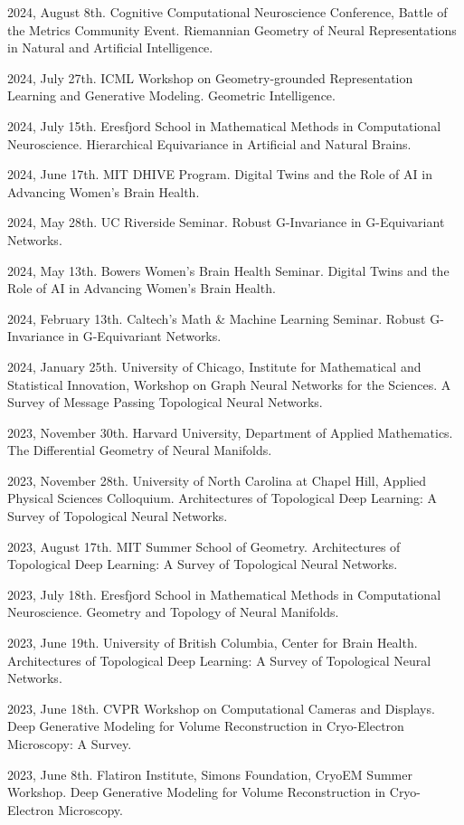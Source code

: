 2024, August 8th. Cognitive Computational Neuroscience Conference, Battle of the Metrics Community Event. Riemannian Geometry of Neural Representations in Natural and Artificial Intelligence.

2024, July 27th. ICML Workshop on Geometry-grounded Representation Learning and Generative Modeling. Geometric Intelligence.

2024, July 15th. Eresfjord School in Mathematical Methods in Computational Neuroscience. Hierarchical Equivariance in Artificial and Natural Brains.

2024, June 17th. MIT DHIVE Program. Digital Twins and the Role of AI in Advancing Women’s Brain Health.

2024, May 28th. UC Riverside Seminar. Robust G-Invariance in G-Equivariant Networks.

2024, May 13th. Bowers Women’s Brain Health Seminar. Digital Twins and the Role of AI in Advancing Women’s Brain Health.

2024, February 13th. Caltech’s Math \& Machine Learning Seminar. Robust G-Invariance in G-Equivariant Networks.

2024, January 25th. University of Chicago, Institute for Mathematical and Statistical Innovation, Workshop on Graph Neural Networks for the Sciences. A Survey of Message Passing Topological Neural Networks.

2023, November 30th. Harvard University, Department of Applied Mathematics. The Differential Geometry of Neural Manifolds.

2023, November 28th. University of North Carolina at Chapel Hill, Applied Physical Sciences Colloquium. Architectures of Topological Deep Learning: A Survey of Topological Neural Networks.

2023, August 17th. MIT Summer School of Geometry. Architectures of Topological Deep Learning: A Survey of Topological Neural Networks.

2023, July 18th. Eresfjord School in Mathematical Methods in Computational Neuroscience. Geometry and Topology of Neural Manifolds.

2023, June 19th. University of British Columbia, Center for Brain Health. Architectures of Topological Deep Learning: A Survey of Topological Neural Networks.

2023, June 18th. CVPR Workshop on Computational Cameras and Displays. Deep Generative Modeling for Volume Reconstruction in Cryo-Electron Microscopy: A Survey.

2023, June 8th. Flatiron Institute, Simons Foundation, CryoEM Summer Workshop. Deep Generative Modeling for Volume Reconstruction in Cryo-Electron Microscopy.

